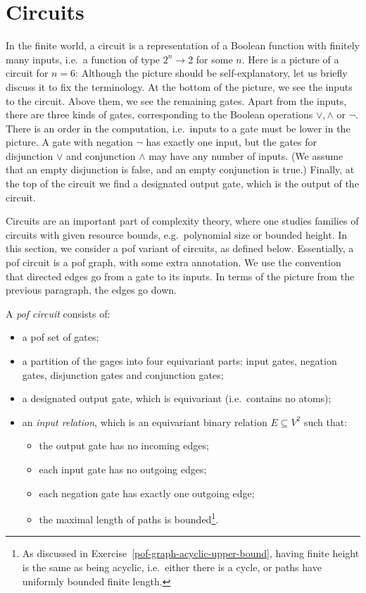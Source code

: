 \section{Circuits}
\label{sec:circuits}
In the finite world, a circuit is a representation of a Boolean function with finitely many inputs, i.e.~a function of type $2^n \to 2$ for some $n$. Here is a picture of a circuit for $n=6$: 
Although the picture should be self-explanatory, let us briefly discuss it to fix the terminology.
At the bottom of the picture, we see the  inputs to the circuit. Above them, we see the remaining gates. Apart from the inputs, there  are three kinds of gates, corresponding to the Boolean operations $\lor, \land$ or $\neg$. There is an order in the computation, i.e.~inputs to a gate must be lower in the picture. A gate with negation $\neg$ has exactly one input, but the gates for disjunction $\lor$ and conjunction $\land$ may have any number of inputs. (We assume that an empty disjunction is false, and an empty conjunction is true.) Finally, at the top of the circuit we find a designated output gate, which is the output of the circuit. 

Circuits are an important part of complexity theory, where one studies families of circuits with given resource bounds, e.g.~polynomial size or bounded height. 
In this section, we consider a pof variant of circuits, as defined below. Essentially, a pof circuit is a pof graph, with some extra annotation. We use the convention that directed edges go from a gate to its inputs. In terms of the picture from the previous paragraph,  the edges go down. 

\begin{definition}
	\label{def:pof-circuit}
	A \emph{pof circuit} consists of:
	\begin{itemize}
		\item a pof set of gates;
		\item a  partition of the gages into four equivariant parts: input gates, negation gates, disjunction gates and conjunction gates;
		\item a designated output gate, which is equivariant (i.e.~contains no atoms);
		\item an \emph{input relation}, which is an equivariant binary relation $E \subseteq V^2$ such that: 
		\begin{itemize}
			\item the output gate has no incoming edges;
			\item each input gate has no outgoing edges;
			\item each negation gate has exactly one outgoing edge;
			\item the maximal length of paths is bounded\footnote{As discussed in Exercise~\ref{pof-graph-acyclic-upper-bound}, having finite height is the same as being acyclic, i.e.~either there is a cycle, or paths have uniformly bounded finite length. }.
		\end{itemize}
	\end{itemize}
\end{definition}

